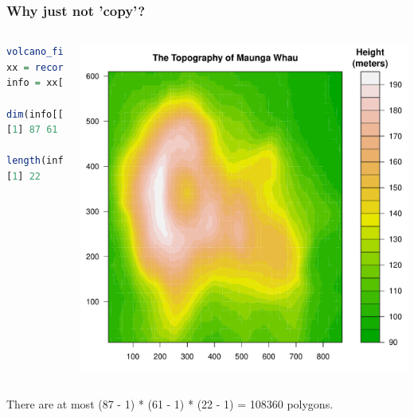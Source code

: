 \documentclass{beamer}
\begin{document}
\begin{frame}[fragile]
\frametitle{Why just not 'copy'?}

\begin{columns}[c]
\begin{lstlisting}[language = R]
volcano_filled.contour()
xx = recordPlot()
info = xx[[1]][[12]][[2]]

dim(info[[4]])
[1] 87 61

length(info[[5]])
[1] 22
 
\end{lstlisting}
\begin{center}
\includegraphics{plot/filled_example_1}
\end{center}

\end{columns}
There are at most (87 - 1) * (61 - 1) * (22 - 1) =  108360 polygons.


\end{frame}


\end{document}

